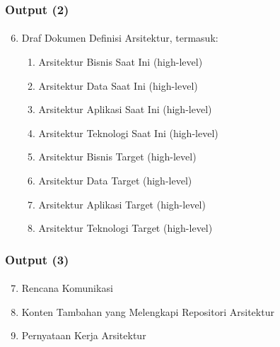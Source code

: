 \documentclass[aspectratio=169, table]{beamer}
\begin{document}
	\begin{frame}
		\frametitle{Output (2)}
		\framesubtitle{\hspace{1cm}}
		\begin{enumerate}
			\setcounter{enumi}{5}
			\item Draf Dokumen Definisi Arsitektur, termasuk:
			\begin{enumerate}
				\item Arsitektur Bisnis Saat Ini (high-level)
				\item Arsitektur Data Saat Ini (high-level)
				\item Arsitektur Aplikasi Saat Ini (high-level)
				\item Arsitektur Teknologi Saat Ini (high-level)
				\item Arsitektur Bisnis Target (high-level)
				\item Arsitektur Data Target (high-level)
				\item Arsitektur Aplikasi Target (high-level)
				\item Arsitektur Teknologi Target (high-level)
			\end{enumerate}

		\end{enumerate}
	\end{frame}


	\begin{frame}
		\frametitle{Output (3)}
		\framesubtitle{\hspace{1cm}}
		\begin{enumerate}
			\setcounter{enumi}{6}
			\item Rencana Komunikasi
			\item Konten Tambahan yang Melengkapi Repositori Arsitektur
			\item Pernyataan Kerja Arsitektur
		\end{enumerate}
	\end{frame}
\end{document}
